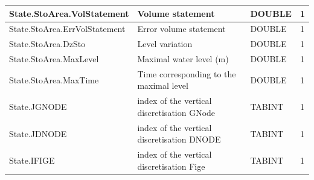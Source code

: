 \documentclass[a4paper,11pt]{article}
\begin{document}
\begin{landscape}
\begin{table}[ht]
\begin{center}
\begin{tabular}{|l|l|l|l|}
\hline  State.StoArea.VolStatement & Volume statement & DOUBLE & 1 \\
\hline  State.StoArea.ErrVolStatement & Error volume statement & DOUBLE & 1 \\
\hline  State.StoArea.DzSto & Level variation & DOUBLE & 1 \\
\hline  State.StoArea.MaxLevel & Maximal water level (m) & DOUBLE & 1 \\
\hline  State.StoArea.MaxTime & Time corresponding to the maximal level & DOUBLE & 1 \\
\hline  State.JGNODE & index of the vertical discretisation GNode & TABINT & 1 \\
\hline  State.JDNODE & index of the vertical discretisation DNODE & TABINT & 1 \\
\hline  State.IFIGE & index of the vertical discretisation  Fige & TABINT & 1 \\
\hline

\end{tabular} 
\end{center}
\end{table}
\begin{table}[ht]
\begin{center}
\begin{tabular}{|l|l|l|l|}


\end{tabular}
\end{center}
\end{table}
\end{landscape}
\end{document}
